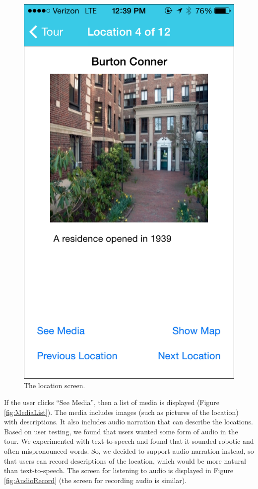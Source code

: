 \documentclass{sigchi}
\begin{document}
\begin{figure}
\centering
\includegraphics[width=0.7\linewidth]{./LocationScreen}
\caption{The location screen.}
\label{fig:LocationScreen}
\end{figure}

If the user clicks ``See Media'', then a list of media is displayed (Figure \ref{fig:MediaList}). The media includes images (such as pictures of the location) with descriptions. It also includes audio narration that can describe the locations. Based on user testing, we found that users wanted some form of audio in the tour. We experimented with text-to-speech and found that it sounded robotic and often mispronounced words. So, we decided to support audio narration instead, so that users can record descriptions of the location, which would be more natural than text-to-speech. The screen for listening to audio is displayed in Figure \ref{fig:AudioRecord} (the screen for recording audio is similar).
\end{document}
